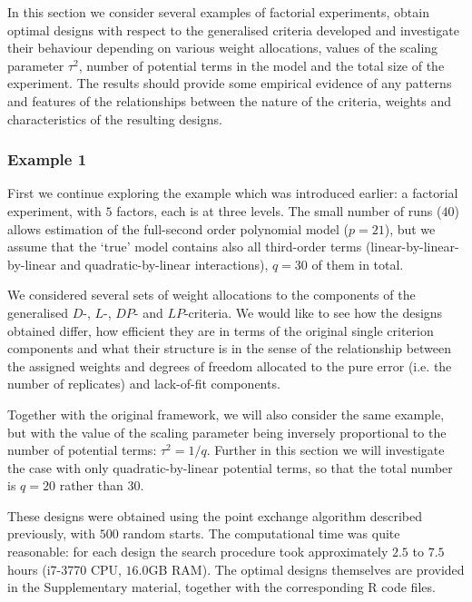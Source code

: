 In this section we consider several examples of factorial experiments, obtain optimal designs with respect to the generalised criteria developed and investigate their behaviour depending on various weight allocations, values of the scaling parameter $\tau^2$, number of potential terms in the model and the total size of the experiment. The results should provide some empirical evidence of any patterns and features of the relationships between the nature of the criteria, weights and characteristics of the resulting designs. 

\subsubsection{Example 1}
\label{sec::generalised_example}
First we continue exploring the example which was introduced earlier: a factorial experiment, with $5$ factors, each is at three levels. The small number of runs ($40$) allows estimation of the full-second order polynomial model ($p=21$), but we assume that the `true' model contains also all third-order terms (linear-by-linear-by-linear and quadratic-by-linear interactions), $q=30$ of them in total.

We considered several sets of weight allocations to the components of the generalised $D$-, $L$-, $DP$- and $LP$-criteria. We would like to see how the designs obtained differ, how efficient they are in terms of the original single criterion components and what their structure is in the sense of the relationship between the assigned weights and degrees of freedom allocated to the  pure error (i.e. the number of replicates) and lack-of-fit components.

Together with the original framework, we will also consider the same example, but with the value of the scaling parameter being inversely proportional to the number of potential terms: $\tau^2=1/q$. Further in this section we will investigate the case with only quadratic-by-linear potential terms, so that the total number is $q=20$ rather than $30$. 

These designs were obtained using the point exchange algorithm described previously, with $500$ random starts. The computational time was quite reasonable: for each design the search procedure took approximately $2.5$ to $7.5$ hours (i7-3770 CPU, $16.0$GB RAM). The optimal designs themselves are provided in the Supplementary material, together with the corresponding R code files.


